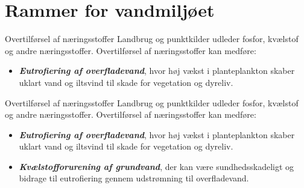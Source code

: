 \section{Rammer for vandmiljøet}

\begin{frame}{Overtilførsel af næringsstoffer}
  Landbrug og punktkilder udleder fosfor, kvælstof og andre næringsstoffer. Overtilførsel af næringsstoffer kan medføre:
  \begin{itemize}
    \item \textbf{\textit{Eutrofiering af overfladevand}}, hvor høj vækst i planteplankton skaber uklart vand og iltsvind til skade for vegetation og dyreliv.
  \end{itemize}
  \vfill
\end{frame}
\begin{frame}{Overtilførsel af næringsstoffer}
  Landbrug og punktkilder udleder fosfor, kvælstof og andre næringsstoffer. Overtilførsel af næringsstoffer kan medføre:
  \begin{itemize}
    \item \textbf{\textit{Eutrofiering af overfladevand}}, hvor høj vækst i planteplankton skaber uklart vand og iltsvind til skade for vegetation og dyreliv.
    \item \textbf{\textit{Kvælstofforurening af grundvand}}, der kan være sundhedsskadeligt og bidrage til eutrofiering gennem udstrømning til overfladevand.
  \end{itemize}
\end{frame}

